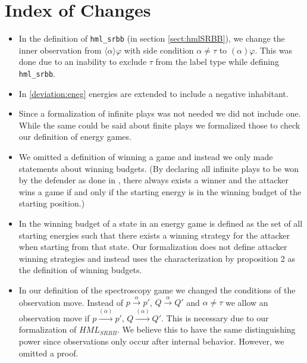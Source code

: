 \section{Index of Changes}
\begin{itemize}
    \item In the definition of \texttt{hml\_srbb} (in section \ref{sect:hmlSRBB}), we change the inner observation from
    $\langle\alpha\rangle\varphi$ with side condition $\alpha \neq \tau$ to $(\alpha)\varphi$.
    This was done due to an inability to exclude $\tau$ from the label type while defining \texttt{hml\_srbb}. 
    
    \item In \ref{deviation:eneg} energies are extended to include a negative inhabitant. 
    
    \item Since a formalization of infinite plays was not needed we did not include one. While the 
    same could be said about finite plays we formalized those to check our definition of energy games.
    
    \item We omitted a definition of winning a game and instead we only made statements about winning budgets. 
    (By declaring all infinite plays to be won by the defender as done in \cite{bisping2023lineartimebranchingtime}, 
    there always exists a winner and the attacker wins a game if and only if the starting energy is in the winning budget of the starting position.)
    
    \item In \cite{bisping2023lineartimebranchingtime} the winning budget of a state in an energy game 
    is defined as the set of all starting energies such that there exists a winning strategy for the attacker 
    when starting from that state. Our formalization does not define attacker winning strategies and instead 
    uses the characterization by proposition 2 \cite[p. 9]{bisping2023lineartimebranchingtime} as the definition of winning budgets.
    
    \item In our definition of the spectroscopy game we changed the conditions of the observation move. 
    Instead of $p \overset{\alpha}{\longrightarrow}p'$, $Q \overset{\alpha}{\longrightarrow} Q'$ and $\alpha \neq \tau$
    we allow an observation move if  $p \overset{(\alpha)}{\longrightarrow}p'$, $Q \overset{(\alpha)}{\longrightarrow} Q'$.
    This is necessary due to our formalization of $HML_{SRBB}$. We believe this to have the same distinguishing power 
    since observations only occur after internal behavior. However, we omitted a proof. 
    

\end{itemize}
